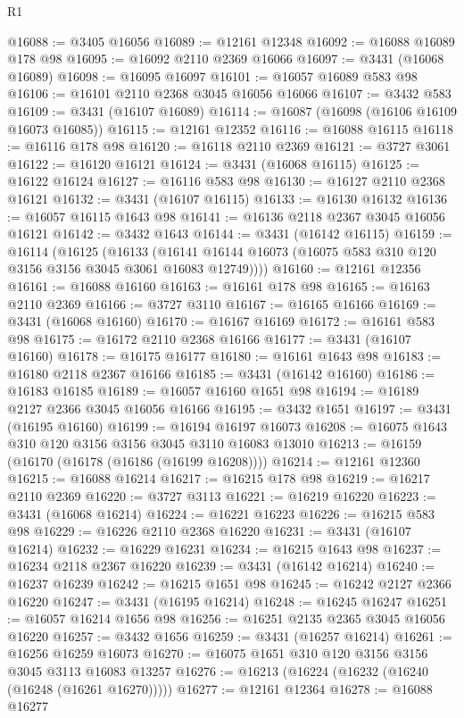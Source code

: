 \begin{lexlean}{R1}
\begin{coremodule}
@16088 := @3405 @16056
@16089 := @12161 @12348
@16092 := @16088 @16089 @178 @98
@16095 := @16092 @2110 @2369 @16066
@16097 := @3431 (@16068 @16089)
@16098 := @16095 @16097
@16101 := @16057 @16089 @583 @98
@16106 := @16101 @2110 @2368 @3045 @16056 @16066
@16107 := @3432 @583
@16109 := @3431 (@16107 @16089)
@16114 := @16087 (@16098 (@16106 @16109 @16073 @16085))
@16115 := @12161 @12352
@16116 := @16088 @16115
@16118 := @16116 @178 @98
@16120 := @16118 @2110 @2369
@16121 := @3727 @3061
@16122 := @16120 @16121
@16124 := @3431 (@16068 @16115)
@16125 := @16122 @16124
@16127 := @16116 @583 @98
@16130 := @16127 @2110 @2368 @16121
@16132 := @3431 (@16107 @16115)
@16133 := @16130 @16132
@16136 := @16057 @16115 @1643 @98
@16141 := @16136 @2118 @2367 @3045 @16056 @16121
@16142 := @3432 @1643
@16144 := @3431 (@16142 @16115)
@16159 := @16114
    (@16125
      (@16133 (@16141 @16144 @16073 (@16075 @583 @310 @120 @3156 @3156 @3045 @3061 @16083 @12749))))
@16160 := @12161 @12356
@16161 := @16088 @16160
@16163 := @16161 @178 @98
@16165 := @16163 @2110 @2369
@16166 := @3727 @3110
@16167 := @16165 @16166
@16169 := @3431 (@16068 @16160)
@16170 := @16167 @16169
@16172 := @16161 @583 @98
@16175 := @16172 @2110 @2368 @16166
@16177 := @3431 (@16107 @16160)
@16178 := @16175 @16177
@16180 := @16161 @1643 @98
@16183 := @16180 @2118 @2367 @16166
@16185 := @3431 (@16142 @16160)
@16186 := @16183 @16185
@16189 := @16057 @16160 @1651 @98
@16194 := @16189 @2127 @2366 @3045 @16056 @16166
@16195 := @3432 @1651
@16197 := @3431 (@16195 @16160)
@16199 := @16194 @16197 @16073
@16208 := @16075 @1643 @310 @120 @3156 @3156 @3045 @3110 @16083 @13010
@16213 := @16159 (@16170 (@16178 (@16186 (@16199 @16208))))
@16214 := @12161 @12360
@16215 := @16088 @16214
@16217 := @16215 @178 @98
@16219 := @16217 @2110 @2369
@16220 := @3727 @3113
@16221 := @16219 @16220
@16223 := @3431 (@16068 @16214)
@16224 := @16221 @16223
@16226 := @16215 @583 @98
@16229 := @16226 @2110 @2368 @16220
@16231 := @3431 (@16107 @16214)
@16232 := @16229 @16231
@16234 := @16215 @1643 @98
@16237 := @16234 @2118 @2367 @16220
@16239 := @3431 (@16142 @16214)
@16240 := @16237 @16239
@16242 := @16215 @1651 @98
@16245 := @16242 @2127 @2366 @16220
@16247 := @3431 (@16195 @16214)
@16248 := @16245 @16247
@16251 := @16057 @16214 @1656 @98
@16256 := @16251 @2135 @2365 @3045 @16056 @16220
@16257 := @3432 @1656
@16259 := @3431 (@16257 @16214)
@16261 := @16256 @16259 @16073
@16270 := @16075 @1651 @310 @120 @3156 @3156 @3045 @3113 @16083 @13257
@16276 := @16213 (@16224 (@16232 (@16240 (@16248 (@16261 @16270)))))
@16277 := @12161 @12364
@16278 := @16088 @16277

\end{coremodule}
\end{lexlean}
